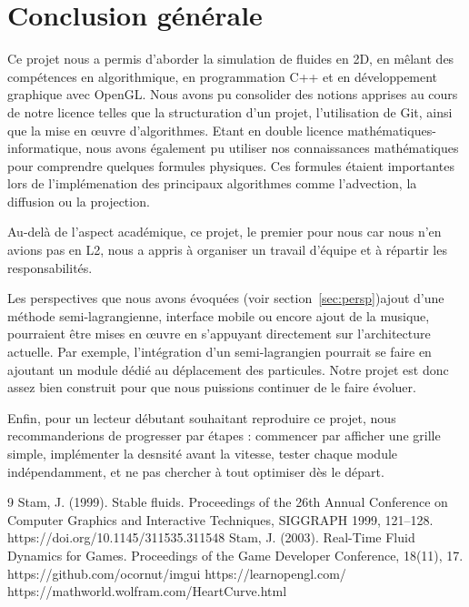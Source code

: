 \documentclass[a4paper]{article}
\begin{document}
\section{Conclusion générale}

\hspace*{\parindent} Ce projet nous a permis d’aborder la simulation de fluides en 2D,
    en mêlant des compétences en algorithmique, en programmation C++ et en développement graphique
    avec OpenGL. Nous avons pu consolider des notions apprises au cours de notre licence
    telles que la structuration d’un projet, l’utilisation de Git, ainsi que la mise en
    œuvre d’algorithmes. Etant en double licence mathématiques-informatique, nous avons également 
    pu utiliser nos connaissances mathématiques pour comprendre 
    quelques formules physiques. Ces formules étaient importantes lors de l'implémenation des principaux 
    algorithmes comme l’advection, la diffusion ou la projection.

    Au-delà de l’aspect académique, ce projet, le premier pour nous car nous n'en avions pas 
    en L2, nous a appris à organiser un travail d’équipe et à répartir les
    responsabilités. 

    Les perspectives que nous avons évoquées (voir section~\ref{sec:persp})ajout d’une méthode semi-lagrangienne, interface
    mobile ou encore ajout de la musique, pourraient être mises en œuvre en
    s’appuyant directement sur l’architecture actuelle. Par exemple, l’intégration d’un semi-lagrangien
    pourrait se faire en ajoutant un module dédié au déplacement des particules. Notre projet est donc assez bien
    construit pour que nous puissions continuer de le faire évoluer. 

    Enfin, pour un lecteur débutant souhaitant reproduire ce projet, nous recommanderions de progresser
    par étapes : commencer par afficher une grille simple, implémenter la desnsité avant la vitesse, tester
    chaque module indépendamment, et ne pas chercher à tout optimiser dès le départ.



\begin{thebibliography}{9}
Stam, J. (1999). Stable fluids. Proceedings of the 26th Annual Conference on Computer Graphics and Interactive Techniques, SIGGRAPH 1999, 121–128. https://doi.org/10.1145/311535.311548
Stam, J. (2003). Real-Time Fluid Dynamics for Games. Proceedings of the Game Developer Conference, 18(11), 17.
https://github.com/ocornut/imgui
https://learnopengl.com/
https://mathworld.wolfram.com/HeartCurve.html
\end{thebibliography}
\end{document}
